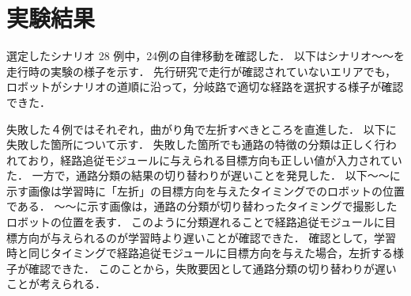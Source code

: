 \section{実験結果}
選定したシナリオ 28 例中，24例の自律移動を確認した．
以下はシナリオ〜〜を走行時の実験の様子を示す．
先行研究で走行が確認されていないエリアでも，ロボットがシナリオの道順に沿って，分岐路で適切な経路を選択する様子が確認できた．

失敗した４例ではそれぞれ，曲がり角で左折すべきところを直進した．
以下に失敗した箇所について示す．
失敗した箇所でも通路の特徴の分類は正しく行われており，経路追従モジュールに与えられる目標方向も正しい値が入力されていた．
一方で，通路分類の結果の切り替わりが遅いことを発見した．
以下〜〜に示す画像は学習時に「左折」の目標方向を与えたタイミングでのロボットの位置である．
〜〜に示す画像は，通路の分類が切り替わったタイミングで撮影したロボットの位置を表す．
このように分類遅れることで経路追従モジュールに目標方向が与えられるのが学習時より遅いことが確認できた．
確認として，学習時と同じタイミングで経路追従モジュールに目標方向を与えた場合，左折する様子が確認できた．
このことから，失敗要因として通路分類の切り替わりが遅いことが考えられる．
